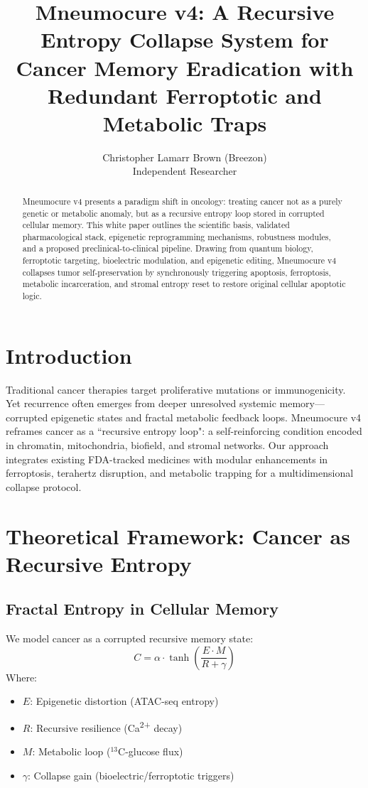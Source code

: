 \documentclass[12pt]{article}
\title{Mneumocure\texttrademark{} v4: A Recursive Entropy Collapse System for Cancer Memory Eradication with Redundant Ferroptotic and Metabolic Traps}
\author{Christopher Lamarr Brown (Breezon) \\ Independent Researcher}
\date{}
\begin{document}
\maketitle

\begin{abstract}
Mneumocure\texttrademark{} v4 presents a paradigm shift in oncology: treating cancer not as a purely genetic or metabolic anomaly, but as a recursive entropy loop stored in corrupted cellular memory. This white paper outlines the scientific basis, validated pharmacological stack, epigenetic reprogramming mechanisms, robustness modules, and a proposed preclinical-to-clinical pipeline. Drawing from quantum biology, ferroptotic targeting, bioelectric modulation, and epigenetic editing, Mneumocure\texttrademark{} v4 collapses tumor self-preservation by synchronously triggering apoptosis, ferroptosis, metabolic incarceration, and stromal entropy reset to restore original cellular apoptotic logic.
\end{abstract}

\section{Introduction}
Traditional cancer therapies target proliferative mutations or immunogenicity. Yet recurrence often emerges from deeper unresolved systemic memory---corrupted epigenetic states and fractal metabolic feedback loops. Mneumocure\texttrademark{} v4 reframes cancer as a ``recursive entropy loop": a self-reinforcing condition encoded in chromatin, mitochondria, biofield, and stromal networks. Our approach integrates existing FDA-tracked medicines with modular enhancements in ferroptosis, terahertz disruption, and metabolic trapping for a multidimensional collapse protocol.

\section{Theoretical Framework: Cancer as Recursive Entropy}
\subsection{Fractal Entropy in Cellular Memory}
We model cancer as a corrupted recursive memory state:
\[
C = \alpha \cdot \tanh\left(\frac{E \cdot M}{R + \gamma}\right)
\]
Where:
\begin{itemize}
    \item $E$: Epigenetic distortion (ATAC-seq entropy)
    \item $R$: Recursive resilience (Ca\textsuperscript{2+} decay)
    \item $M$: Metabolic loop ($^{13}$C-glucose flux)
    \item $\gamma$: Collapse gain (bioelectric/ferroptotic triggers)
\end{itemize}
\end{document}
